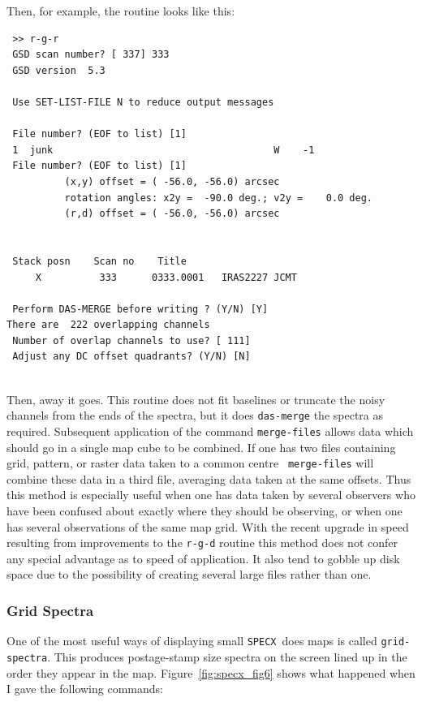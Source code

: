 \documentclass[11pt,twoside]{article}
\newcommand{\SPECX}{{\tt SPECX}}
\begin{document}
Then, for example, the routine looks like this:

\begin{verbatim} >> r-g-r
 GSD scan number? [ 337] 333
 GSD version  5.3
 
 Use SET-LIST-FILE N to reduce output messages
 
 File number? (EOF to list) [1]  
 1  junk                                      W    -1
 File number? (EOF to list) [1] 
          (x,y) offset = ( -56.0, -56.0) arcsec
          rotation angles: x2y =  -90.0 deg.; v2y =    0.0 deg.
          (r,d) offset = ( -56.0, -56.0) arcsec
 
 
 Stack posn    Scan no    Title
     X          333      0333.0001   IRAS2227 JCMT 

 Perform DAS-MERGE before writing ? (Y/N) [Y] 
There are  222 overlapping channels
 Number of overlap channels to use? [ 111] 
 Adjust any DC offset quadrants? (Y/N) [N] 
 
\end{verbatim} 

Then, away it goes. This routine does not fit baselines or truncate
the noisy channels from the ends of the spectra, but it
does {\tt das-merge} the spectra as required. Subsequent application
of the command {\tt merge-files} allows data which should go in a
single map cube to be combined. If one has two files containing 
grid, pattern, or raster data taken to a common centre {\tt
merge-files} will combine these data in a third file, averaging data
taken at the same offsets. Thus this method is especially useful when
one has data taken by several observers who have been confused about
exactly where they should be observing, or when one has several
observations of the same map grid. With the recent upgrade in speed
resulting from improvements to the {\tt r-g-d} routine this method
does not confer any special advantage as to speed of application. It
also tend to gobble up disk space due to the possibility of creating
several large files rather than one.  
 
\subsubsection{Grid Spectra}
\label{sec:specx_13.3}
One of the most useful ways of displaying small \SPECX\ does maps is
called {\tt grid-spectra}. This produces postage-stamp size spectra on
the screen lined up in the order they appear in the map.
Figure~\ref{fig:specx_fig6} shows what happened when I gave the
following commands:
\end{document}
